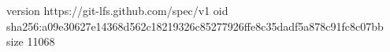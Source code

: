 version https://git-lfs.github.com/spec/v1
oid sha256:a09e30627e14368d562c18219326c85277926ffe8c35dadf5a878c91fc8c07bb
size 11068
